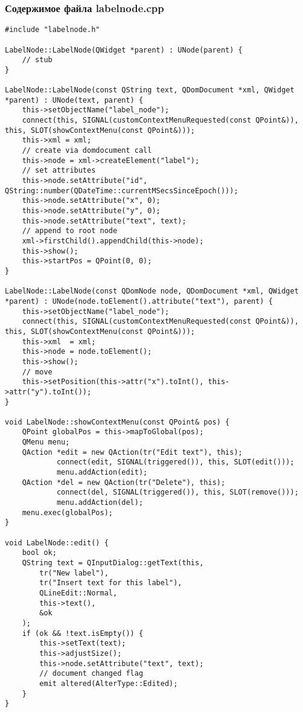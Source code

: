 \subsubsection*{Содержимое файла labelnode.cpp}

\begin{lstlisting}
#include "labelnode.h"

LabelNode::LabelNode(QWidget *parent) : UNode(parent) {
    // stub
}

LabelNode::LabelNode(const QString text, QDomDocument *xml, QWidget *parent) : UNode(text, parent) {
    this->setObjectName("label_node");
    connect(this, SIGNAL(customContextMenuRequested(const QPoint&)), this, SLOT(showContextMenu(const QPoint&)));
    this->xml = xml;
    // create via domdocument call
    this->node = xml->createElement("label");
    // set attributes
    this->node.setAttribute("id", QString::number(QDateTime::currentMSecsSinceEpoch()));
    this->node.setAttribute("x", 0);
    this->node.setAttribute("y", 0);
    this->node.setAttribute("text", text);
    // append to root node
    xml->firstChild().appendChild(this->node);
    this->show();
    this->startPos = QPoint(0, 0);
}

LabelNode::LabelNode(const QDomNode node, QDomDocument *xml, QWidget *parent) : UNode(node.toElement().attribute("text"), parent) {
    this->setObjectName("label_node");
    connect(this, SIGNAL(customContextMenuRequested(const QPoint&)), this, SLOT(showContextMenu(const QPoint&)));
    this->xml  = xml;
    this->node = node.toElement();
    this->show();
    // move
    this->setPosition(this->attr("x").toInt(), this->attr("y").toInt());
}

void LabelNode::showContextMenu(const QPoint& pos) {
    QPoint globalPos = this->mapToGlobal(pos);
    QMenu menu;
    QAction *edit = new QAction(tr("Edit text"), this);
            connect(edit, SIGNAL(triggered()), this, SLOT(edit()));
            menu.addAction(edit);
    QAction *del = new QAction(tr("Delete"), this);
            connect(del, SIGNAL(triggered()), this, SLOT(remove()));
            menu.addAction(del);
    menu.exec(globalPos);
}

void LabelNode::edit() {
    bool ok;
    QString text = QInputDialog::getText(this,
        tr("New label"),
        tr("Insert text for this label"),
        QLineEdit::Normal,
        this->text(),
        &ok
    );
    if (ok && !text.isEmpty()) {
        this->setText(text);
        this->adjustSize();
        this->node.setAttribute("text", text);
        // document changed flag
        emit altered(AlterType::Edited);
    }
}
\end{lstlisting}~\\

